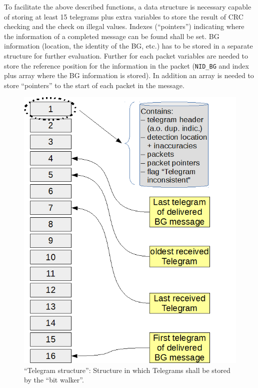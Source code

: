
To facilitate the above described functions, a data structure is necessary capable of storing at least 15 telegrams plus extra variables to store the result of CRC checking and the check on illegal values. Indexes (“pointers”) indicating where the information of a completed message can be found shall be set. BG information (location, the identity of the BG, etc.) has to be stored in a separate structure for further evaluation. Further for each packet variables are needed to store the reference position for the information in the packet (\verb+NID_BG+ and index plus array where the BG information is stored). In addition an array is needed to store “pointers” to the start of each packet in the message.


\begin{figure}[ht]
\centering
\includegraphics[scale=0.6]{../images/DataStructure_TelegramStructure.png}
\caption{“Telegram structure”: Structure in which Telegrams shall be stored by the “bit walker”.}\label{fig:DataStructureTelegramStructure}
\end{figure}



